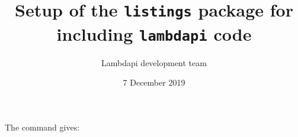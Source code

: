 \documentclass{article}
\title{Setup of the {\tt listings} package for including {\tt lambdapi} code}
\author{Lambdapi development team}
\date{7 December 2019}
\begin{document}
\maketitle

The command \verb|| gives:\\


\end{document}

